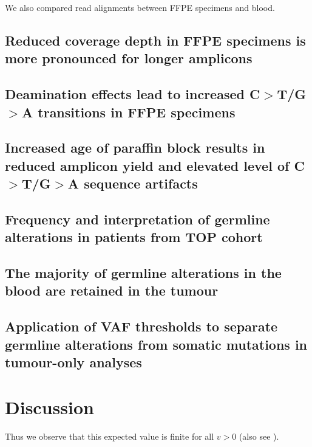 \documentclass{bmcart}
\begin{document}
We also compared read alignments between FFPE specimens and blood.

\subsection*{Reduced coverage depth in FFPE specimens is more pronounced for longer amplicons}

\subsection*{Deamination effects lead to increased C$>$T/G$>$A transitions in FFPE specimens}

\subsection*{Increased age of paraffin block results in reduced amplicon yield and elevated level of C$>$T/G$>$A sequence artifacts}

\subsection*{Frequency and interpretation of germline alterations in patients from TOP cohort}

\subsection*{The majority of germline alterations in the blood are retained in the tumour}

\subsection*{Application of VAF thresholds to separate germline alterations from somatic mutations in tumour-only analyses}

\section*{Discussion}

%
Thus we observe that this expected value is finite for all $v>0$ (also see \cite{koon,khar,zvai,xjon,marg}).

\end{document}
